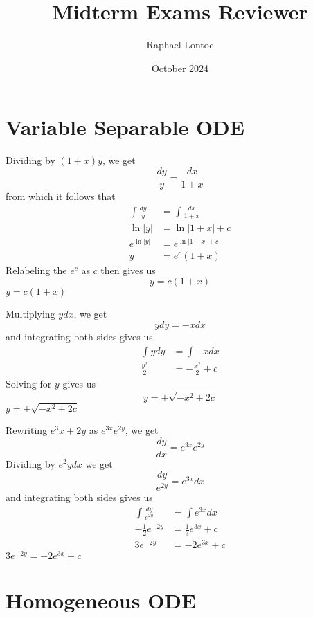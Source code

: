 \documentclass{report}
\title{Midterm Exams Reviewer}
\author{Raphael Lontoc}
\date{October 2024}
\begin{document}
\maketitle

\chapter*{Variable Separable ODE}

\soln Dividing by $(1+x)y$, we get
\[
    \frac{dy}{y} = \frac{dx}{1+x}
\]
from which it follows that
\begin{align*}
    \int \frac{dy}{y} &= \int \frac{dx}{1+x} \\
    \ln|y| &= \ln|1+x| + c \\ 
    e^{\ln|y|} &= e^{\ln|1+x| + c} \\
    y &= e^c(1+x)
\end{align*}
Relabeling the $e^c$ as $c$ then gives us
\[
    y=c(1+x)
\]
\ans $y=c(1+x)$

\medskip

\soln Multiplying $y dx$, we get
\[
    y dy = -x dx
\]
and integrating both sides gives us
\begin{align*}
    \int y dy &= \int -x dx \\
    \frac{y^2}{2} &= -\frac{x^2}{2} + c
\end{align*}
Solving for $y$ gives us
\[
    y = \pm\sqrt{-x^2+2c}
\]
\ans $y = \pm\sqrt{-x^2+2c}$

\medskip

\soln Rewriting $e^3x+2y$ as $e^{3x}e^{2y}$, we get
\[
    \frac{dy}{dx} = e^{3x}e^{2y}
\]
Dividing by $e^2y dx$ we get
\[
    \frac{dy}{e^{2y}} = e^{3x}dx
\]
and integrating both sides gives us
\begin{align*}
    \int \frac{dy}{e^{2y}} &= \int e^{3x}dx \\
    -\frac{1}{2}e^{-2y} &= \frac{1}{3}e^{3x} + c \\
    3e^{-2y} &= -2e^{3x} + c
\end{align*}
\ans $3e^{-2y} = -2e^{3x} + c$

\pagebreak

\chapter*{Homogeneous ODE}
\end{document}
